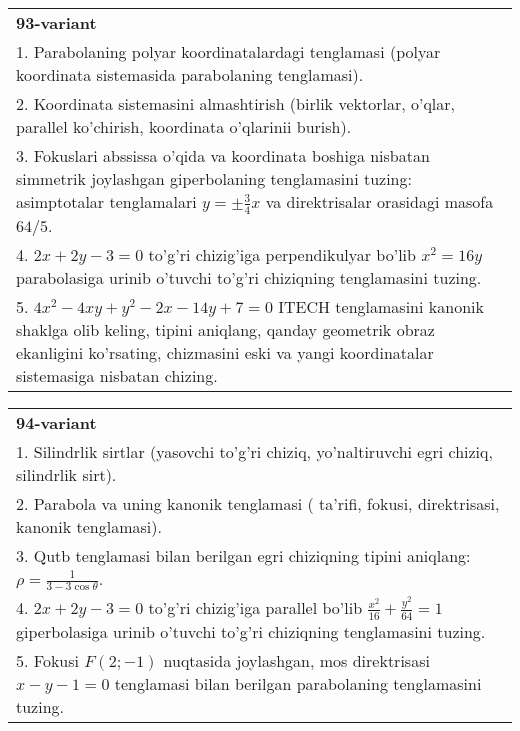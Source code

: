 \documentclass{article}
\begin{document}
\begin{tabular}{m{17cm}}
\textbf{93-variant}\\
1. Parabolaning polyar koordinatalardagi tenglamasi (polyar koordinata sistemasida parabolaning tenglamasi).\\

2. Koordinata sistemasini almashtirish (birlik vektorlar, o'qlar, parallel ko'chirish, koordinata o'qlarinii burish).\\

3. Fokuslari abssissa o'qida va koordinata boshiga nisbatan simmetrik joylashgan giperbolaning tenglamasini tuzing: asimptotalar tenglamalari $y=\pm \frac{3}{4}x$ va direktrisalar orasidagi masofa $64/5$.\\

4. $2x + 2y - 3 = 0$ to'g'ri chizig'iga perpendikulyar bo'lib $x^{2} = 16y$ parabolasiga urinib o'tuvchi to'g'ri chiziqning tenglamasini tuzing.  \\

5. $4x^{2} - 4xy + y^{2} - 2x - 14y + 7 = 0$ ITECH tenglamasini kanonik shaklga olib keling, tipini aniqlang, qanday geometrik obraz ekanligini ko'rsating, chizmasini eski va yangi koordinatalar sistemasiga nisbatan chizing.  
\end{tabular}
\vspace{1cm}


\begin{tabular}{m{17cm}}
\textbf{94-variant}\\
1. Silindrlik sirtlar (yasovchi to'g'ri chiziq, yo'naltiruvchi egri chiziq, silindrlik sirt).\\

2. Parabola va uning kanonik tenglamasi ( ta'rifi, fokusi, direktrisasi, kanonik tenglamasi).\\

3. Qutb tenglamasi bilan berilgan egri chiziqning tipini aniqlang: $\rho=\frac{1}{3-3\cos\theta}$.\\

4. $2x + 2y - 3 = 0$ to'g'ri chizig'iga parallel bo'lib $\frac{x^{2}}{16} + \frac{y^{2}}{64} = 1$ giperbolasiga urinib o'tuvchi to'g'ri chiziqning tenglamasini tuzing.  \\

5. Fokusi $F(2; - 1)$ nuqtasida joylashgan, mos direktrisasi $x - y - 1 = 0$ tenglamasi bilan berilgan parabolaning tenglamasini tuzing.  
\end{tabular}
\vspace{1cm}
\end{document}
